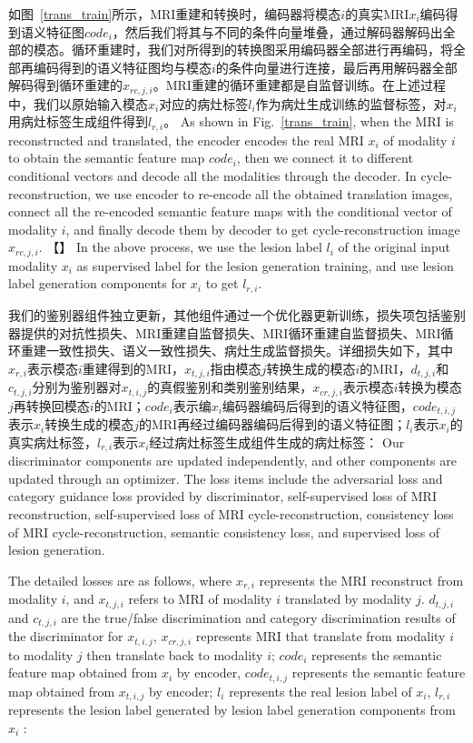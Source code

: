 \documentclass[letterpaper]{article} %
\begin{document}
如图~\ref{trans_train}所示，MRI重建和转换时，编码器将模态$i$的真实MRI$x_i$编码得到语义特征图$code_{i}$，然后我们将其与不同的条件向量堆叠，通过解码器解码出全部的模态。循环重建时，我们对所得到的转换图采用编码器全部进行再编码，将全部再编码得到的语义特征图均与模态$i$的条件向量进行连接，最后再用解码器全部解码得到循环重建的$x_{rc,j,i}$。MRI重建的循环重建都是自监督训练。在上述过程中，我们以原始输入模态$x_i$对应的病灶标签$l_i$作为病灶生成训练的监督标签，对$x_i$用病灶标签生成组件得到$l_{r,i}$。
As shown in Fig.~\ref{trans_train}, when the MRI is reconstructed and translated, the encoder encodes the real MRI $x_i$ of modality $i$ to obtain the semantic feature map $code_{i}$, then we connect it to different conditional vectors and decode all the modalities through the decoder. In cycle-reconstruction, we use encoder to re-encode all the obtained translation images, connect all the re-encoded semantic feature maps with the conditional vector of modality $i$, and finally decode them by decoder to get cycle-reconstruction image $x_{rc,j,i}$. 【】
In the above process, we use the lesion label $l_i$ of the original input modality $x_i$ as supervised label for the lesion generation training, and use lesion label generation components for $x_i$ to get $l_{r,i}$.

我们的鉴别器组件独立更新，其他组件通过一个优化器更新训练，损失项包括鉴别器提供的对抗性损失、MRI重建自监督损失、MRI循环重建自监督损失、MRI循环重建一致性损失、语义一致性损失、病灶生成监督损失。详细损失如下，其中$x_{r,i}$表示模态$i$重建得到的MRI，$x_{t,j,i}$指由模态$j$转换生成的模态$i$的MRI，$d_{t,j,i}$和$c_{t,j,i}$分别为鉴别器对$x_{t,i,j}$的真假鉴别和类别鉴别结果，$x_{cr,j,i}$表示模态$i$转换为模态$j$再转换回模态$i$的MRI；$code_i$表示编$x_i$编码器编码后得到的语义特征图，$code_{t,i,j}$表示$x_i$转换生成的模态$j$的MRI再经过编码器编码后得到的语义特征图；$l_i$表示$x_i$的真实病灶标签，$l_{r,i}$表示$x_i$经过病灶标签生成组件生成的病灶标签：
Our discriminator components are updated independently, and other components are updated through an optimizer. The loss items include the adversarial loss and category guidance loss provided by discriminator, self-supervised loss of MRI reconstruction, self-supervised loss of MRI cycle-reconstruction, consistency loss of MRI cycle-reconstruction, semantic consistency loss, and supervised loss of lesion generation. 

The detailed losses are as follows, where $x_{r,i}$ represents the MRI reconstruct from modality $i$, and $x_{t,j,i}$ refers to MRI of modality $i$ translated by modality $j$. $d_{t, j, i}$ and $c_{t, j, i}$ are the true/false discrimination and category discrimination results of the discriminator for $x_{t, i, j}$, $x_{cr,j,i}$ represents MRI that translate from modality $i$ to modality $j$ then translate back to modality $i$; $code_i$ represents the semantic feature map obtained from $x_i$ by encoder, $code_{t,i,j}$ represents the semantic feature map obtained from $x_{t,i,j}$ by encoder; $l_i$ represents the real lesion label of $x_i$, $l_{r,i}$ represents the lesion label generated by lesion label generation components from $x_i$ :
\end{document}
